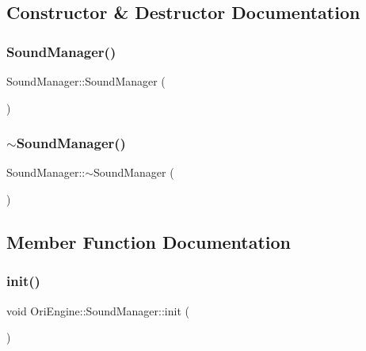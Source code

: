 \subsection{Constructor \& Destructor Documentation}
\hypertarget{class_ori_engine_1_1_sound_manager_abcc1fbf3488be5788a42c9a4fe56df35}{}\label{class_ori_engine_1_1_sound_manager_abcc1fbf3488be5788a42c9a4fe56df35} 
\subsubsection{\texorpdfstring{Sound\+Manager()}{SoundManager()}}
{\footnotesize\ttfamily Sound\+Manager\+::\+Sound\+Manager (\begin{DoxyParamCaption}{ }\end{DoxyParamCaption})}

\hypertarget{class_ori_engine_1_1_sound_manager_ad5dbf8eab22db48ff8f3db51b02f8938}{}\label{class_ori_engine_1_1_sound_manager_ad5dbf8eab22db48ff8f3db51b02f8938} 
\subsubsection{\texorpdfstring{$\sim$\+Sound\+Manager()}{~SoundManager()}}
{\footnotesize\ttfamily Sound\+Manager\+::$\sim$\+Sound\+Manager (\begin{DoxyParamCaption}{ }\end{DoxyParamCaption})}



\subsection{Member Function Documentation}
\hypertarget{class_ori_engine_1_1_sound_manager_a6fbde6d8a9b132fea206fcfb4dd35990}{}\label{class_ori_engine_1_1_sound_manager_a6fbde6d8a9b132fea206fcfb4dd35990} 
\subsubsection{\texorpdfstring{init()}{init()}}
{\footnotesize\ttfamily void Ori\+Engine\+::\+Sound\+Manager\+::init (\begin{DoxyParamCaption}{ }\end{DoxyParamCaption})}

